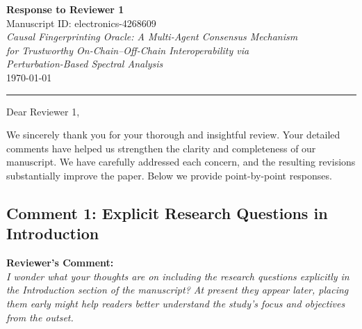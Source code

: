 \documentclass[11pt,a4paper]{article}
\newcommand{\reviewercomment}[1]{%
  \vspace{6pt}\noindent\textbf{\textcolor{reviewercolor}{Reviewer's Comment:}}\\
  \textcolor{reviewercolor}{\itshape #1}\vspace{4pt}}
\begin{document}
\begin{center}
{\LARGE\bfseries Response to Reviewer 1}\\[12pt]
{\large Manuscript ID: electronics-4268609}\\[6pt]
{\large\itshape Causal Fingerprinting Oracle: A Multi-Agent Consensus Mechanism\\
for Trustworthy On-Chain--Off-Chain Interoperability via\\
Perturbation-Based Spectral Analysis}\\[12pt]
\today
\end{center}

\noindent\rule{\textwidth}{0.4pt}

\vspace{8pt}
\noindent Dear Reviewer 1,

\vspace{4pt}
\noindent We sincerely thank you for your thorough and insightful review. Your detailed comments have helped us strengthen the clarity and completeness of our manuscript. We have carefully addressed each concern, and the resulting revisions substantially improve the paper. Below we provide point-by-point responses.

\vspace{12pt}

\subsection*{Comment 1: Explicit Research Questions in Introduction}

\reviewercomment{I wonder what your thoughts are on including the research questions explicitly in the Introduction section of the manuscript? At present they appear later, placing them early might help readers better understand the study's focus and objectives from the outset.}
\end{document}
